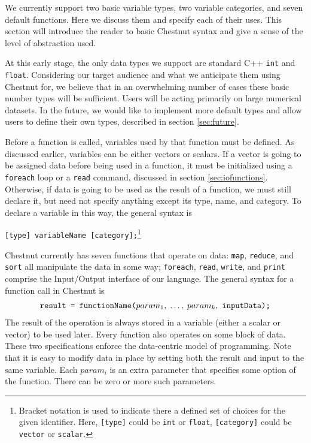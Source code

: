 \documentclass[twocolumn]{article}
\renewcommand{\|}{\origbar} %
\newcommand{\code}[1]{\texttt{#1}}
\begin{document}
We currently support two basic variable types, two variable categories, and seven default functions. Here we discuss them and specify each of their uses. This section will introduce the reader to basic Chestnut syntax and give a sense of the level of abstraction used.

At this early stage, the only data types we support are standard C++ \code{int} and \code{float}. Considering our target audience and what we anticipate them using Chestnut for, we believe that in an overwhelming number of cases these basic number types will be sufficient. Users will be acting primarily on large numerical datasets. In the future, we would like to implement more default types and allow users to define their own types, described in section \ref{sec:future}. 

Before a function is called, variables used by that function must be defined. As discussed earlier, variables can be either vectors or scalars. If a vector is going to be assigned data before being used in a function, it must be initialized using a \code{foreach} loop or a \code{read} command, discussed in section \ref{sec:iofunctions}. Otherwise, if data is going to be used as the result of a function, we must still declare it, but need not specify anything except its type, name, and category. To declare a variable in this way, the general syntax is
\begin{center}
  \code{[type] variableName [category];}\footnote{Bracket notation is used to indicate there a defined set of choices for the given identifier. Here, \code{[type]} could be \code{int} or \code{float}, \code{[category]} could be \code{vector} or \code{scalar}.}
\end{center}

Chestnut currently has seven functions that operate on data: \code{map}, \code{reduce}, and \code{sort} all manipulate the data in some way; \code{foreach}, \code{read}, \code{write}, and \code{print} comprise the Input/Output interface of our language. The general syntax for a function call in Chestnut is
\begin{align*}
  \if@twocolumn
    \code{result } &\code{= functionName(} \\ &\code{$param_1,\;\ldots, \;param_k,$ } \\ &\code{inputData);}
  \else
    \code{result = functionName($param_1,\;\ldots, \;param_k,$ inputData);}
  \fi
\end{align*}
The result of the operation is always stored in a variable (either a scalar or vector) to be used later. Every function also operates on some block of data. These two specifications enforce the data-centric model of programming. Note that it is easy to modify data in place by setting both the result and input to the same variable. Each $param_i$ is an extra parameter that specifies some option of the function. There can be zero or more such parameters. 
\end{document}
